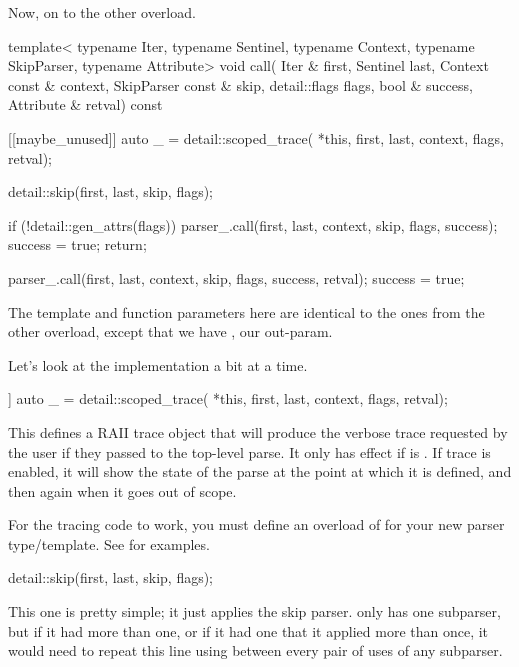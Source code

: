 \documentclass{MyBook}
\begin{document}
Now, on to the other overload.

\begin{code}
template<
    typename Iter,
    typename Sentinel,
    typename Context,
    typename SkipParser,
    typename Attribute>
void call(
    Iter & first,
    Sentinel last,
    Context const & context,
    SkipParser const & skip,
    detail::flags flags,
    bool & success,
    Attribute & retval) const
{
    [[maybe_unused]] auto _ = detail::scoped_trace(
        *this, first, last, context, flags, retval);

    detail::skip(first, last, skip, flags);

    if (!detail::gen_attrs(flags)) {
        parser_.call(first, last, context, skip, flags, success);
        success = true;
        return;
    }

    parser_.call(first, last, context, skip, flags, success, retval);
    success = true;
}
\end{code}

The template and function parameters here are identical to the ones from the other overload, except that we have , our out-param.

Let's look at the implementation a bit at a time.

\begin{code}
[[maybe_unused]] auto _ = detail::scoped_trace(
    *this, first, last, context, flags, retval);
\end{code}

This defines a RAII trace object that will produce the verbose trace requested by the user if they passed  to the top-level parse. It only has effect if  is . If trace is enabled, it will show the state of the parse at the point at which it is defined, and then again when it goes out of scope.

\begin{marker}[title=Important ]
For the tracing code to work, you must define an overload of  for your new parser type/template. See  for examples. 
\end{marker}

\begin{code}
detail::skip(first, last, skip, flags);
\end{code}

This one is pretty simple; it just applies the skip parser.  only has one subparser, but if it had more than one, or if it had one that it applied more than once, it would need to repeat this line using  between every pair of uses of any subparser.
\end{document}
